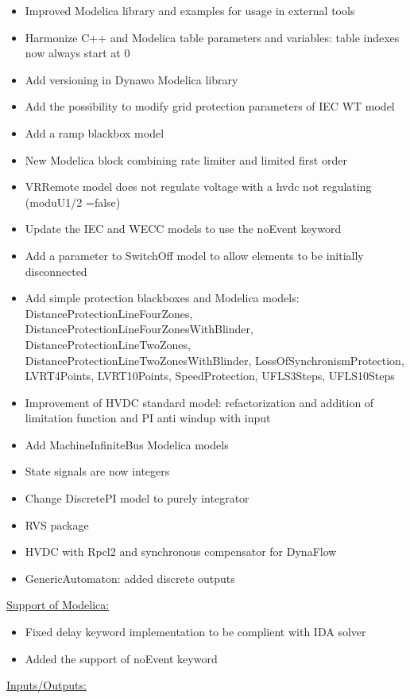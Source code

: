 \documentclass[a4paper, 12pt]{report}
\begin{document}
\begin{itemize}
\item Improved Modelica library and examples for usage in external tools
\item Harmonize C++ and Modelica table parameters and variables: table indexes now always start at 0
\item Add versioning in Dynawo Modelica library
\item Add the possibility to modify grid protection parameters of IEC WT model
\item Add a ramp blackbox model
\item New Modelica block combining rate limiter and limited first order
\item VRRemote model does not regulate voltage with a hvdc not regulating (moduU1/2 =false)
\item Update the IEC and WECC models to use the noEvent keyword
\item Add a parameter to SwitchOff model to allow elements to be initially disconnected
\item Add simple protection blackboxes and Modelica models: DistanceProtectionLineFourZones, DistanceProtectionLineFourZonesWithBlinder, DistanceProtectionLineTwoZones, DistanceProtectionLineTwoZonesWithBlinder, LossOfSynchronismProtection, LVRT4Points, LVRT10Points, SpeedProtection, UFLS3Steps, UFLS10Steps
\item Improvement of HVDC standard model: refactorization and addition of limitation function and PI anti windup with input
\item Add MachineInfiniteBus Modelica models
\item State signals are now integers
\item Change DiscretePI model to purely integrator
\item RVS package
\item HVDC with Rpcl2 and synchronous compensator for DynaFlow
\item GenericAutomaton: added discrete outputs
\end{itemize}

\underline{Support of Modelica:}

\begin{itemize}
\item Fixed delay keyword implementation to be complient with IDA solver
\item Added the support of noEvent keyword
\end{itemize}

\underline{Inputs/Outputs:}
\end{document}
